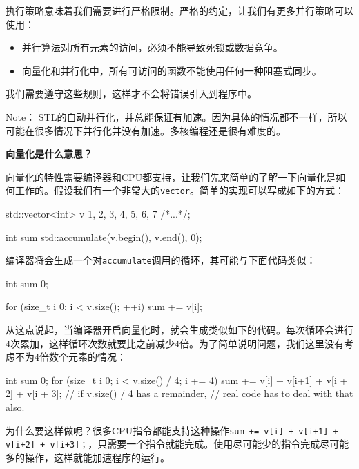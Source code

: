 执行策略意味着我们需要进行严格限制。严格的约定，让我们有更多并行策略可以使用：

\begin{itemize}
\item 并行算法对所有元素的访问，必须不能导致死锁或数据竞争。

\item 向量化和并行化中，所有可访问的函数不能使用任何一种阻塞式同步。

\end{itemize}

我们需要遵守这些规则，这样才不会将错误引入到程序中。

\begin{myInfoBox}
Note： STL的自动并行化，并总能保证有加速。因为具体的情况都不一样，所以可能在很多情况下并行化并没有加速。多核编程还是很有难度的。
\end{myInfoBox}

\textbf{向量化是什么意思？}

向量化的特性需要编译器和CPU都支持，让我们先来简单的了解一下向量化是如何工作的。假设我们有一个非常大的\texttt{vector}。简单的实现可以写成如下的方式：

\begin{codebox}[cpp]
std::vector<int> v {1, 2, 3, 4, 5, 6, 7 /*...*/};

int sum {std::accumulate(v.begin(), v.end(), 0)};
\end{codebox}

编译器将会生成一个对\texttt{accumulate}调用的循环，其可能与下面代码类似：

\begin{codebox}[cpp]
int sum {0};

for (size_t i {0}; i < v.size(); ++i) {
    sum += v[i];
}
\end{codebox}

从这点说起，当编译器开启向量化时，就会生成类似如下的代码。每次循环会进行4次累加，这样循环次数就要比之前减少4倍。为了简单说明问题，我们这里没有考虑不为4倍数个元素的情况：

\begin{codebox}[cpp]
int sum {0};
for (size_t i {0}; i < v.size() / 4; i += 4) {
    sum += v[i] + v[i+1] + v[i + 2] + v[i + 3];
}
// if v.size() / 4 has a remainder,
// real code has to deal with that also.
\end{codebox}

为什么要这样做呢？很多CPU指令都能支持这种操作\texttt{sum += v[i] + v[i+1] + v[i+2] + v[i+3]；}，只需要一个指令就能完成。使用尽可能少的指令完成尽可能多的操作，这样就能加速程序的运行。

